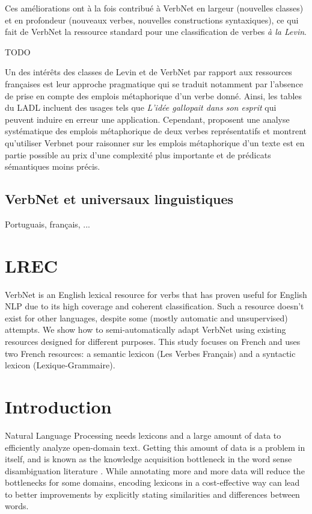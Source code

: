 Ces améliorations ont à la fois contribué à VerbNet en largeur (nouvelles
classes) et en profondeur (nouveaux verbes, nouvelles constructions
syntaxiques), ce qui fait de VerbNet la ressource standard pour une
classification de verbes \textit{à la Levin}.

TODO

Un des intérêts des classes de Levin et de VerbNet par rapport aux ressources
françaises est leur approche pragmatique qui se traduit notamment par l'absence
de prise en compte des emplois métaphorique d'un verbe donné. Ainsi, les tables
du LADL incluent des usages tels que \textit{L'idée gallopait dans son esprit}
qui peuvent induire en erreur une application. Cependant,
\cite{brown2012semantic} proposent une analyse systématique des emplois
métaphorique de deux verbes représentatifs et montrent qu'utiliser Verbnet pour
raisonner sur les emplois métaphorique d'un texte est en partie possible au
prix d'une complexité plus importante et de prédicats sémantiques moins précis.

\subsection{VerbNet et universaux linguistiques}

Portuguais, français, ...

\section{LREC}

VerbNet is an English lexical resource for verbs that has proven useful for
English NLP due to its high coverage and coherent classification.  Such a
resource doesn't exist for other languages, despite some (mostly automatic and
unsupervised) attempts. We show how to semi-automatically adapt VerbNet using
existing resources designed for different purposes. This study focuses on
French and uses two French resources: a semantic lexicon (Les Verbes Français)
and a syntactic lexicon (Lexique-Grammaire).

\section{Introduction}

Natural Language Processing needs lexicons and a large amount of data to
efficiently analyze open-domain text. Getting this amount of data is a problem
in itself, and is known as the knowledge acquisition bottleneck in the word
sense disambiguation literature \citep{gale1992using}. While annotating
more and more data will reduce the bottlenecks for some domains, encoding
lexicons in a cost-effective way can lead to better improvements by explicitly
stating similarities and differences between words.


